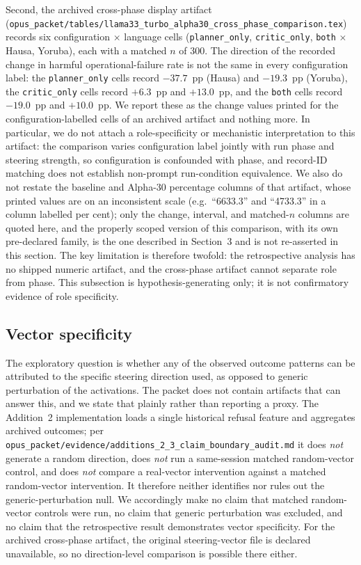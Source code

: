 Second, the archived cross-phase display artifact
(\texttt{opus\_packet/tables/llama33\_turbo\_alpha30\_cross\_phase\_comparison.tex})
records six configuration $\times$ language cells (\texttt{planner\_only},
\texttt{critic\_only}, \texttt{both} $\times$ Hausa, Yoruba), each with a matched
$n$ of 300. The direction of the recorded change in harmful
operational-failure rate is not the same in every configuration label: the
\texttt{planner\_only} cells record $-37.7$~pp (Hausa) and $-19.3$~pp (Yoruba),
the \texttt{critic\_only} cells record $+6.3$~pp and $+13.0$~pp, and the
\texttt{both} cells record $-19.0$~pp and $+10.0$~pp. We report these as the
change values printed for the configuration-labelled cells of an archived
artifact and nothing more. In particular, we do not attach a role-specificity or
mechanistic interpretation to this artifact: the comparison varies configuration
label jointly with run phase and steering strength, so configuration is
confounded with phase, and record-ID matching does not establish non-prompt
run-condition equivalence. We also do not restate the baseline and Alpha-30
percentage columns of that artifact, whose printed values are on an inconsistent
scale (e.g.\ ``6633.3'' and ``4733.3'' in a column labelled per cent); only the
change, interval, and matched-$n$ columns are quoted here, and the properly
scoped version of this comparison, with its own pre-declared family, is the one
described in Section~3 and is not re-asserted in this section. The key
limitation is therefore twofold: the retrospective analysis has no shipped
numeric artifact, and the cross-phase artifact cannot separate role from phase.
This subsection is hypothesis-generating only; it is not confirmatory evidence
of role specificity.

\subsection{Vector specificity}

The exploratory question is whether any of the observed outcome patterns can be
attributed to the specific steering direction used, as opposed to generic
perturbation of the activations. The packet does not contain artifacts that can
answer this, and we state that plainly rather than reporting a proxy. The
Addition~2 implementation loads a single historical refusal feature and
aggregates archived outcomes; per
\texttt{opus\_packet/evidence/additions\_2\_3\_claim\_boundary\_audit.md} it does
\emph{not} generate a random direction, does \emph{not} run a same-session
matched random-vector control, and does \emph{not} compare a real-vector
intervention against a matched random-vector intervention. It therefore neither
identifies nor rules out the generic-perturbation null. We accordingly make no
claim that matched random-vector controls were run, no claim that generic
perturbation was excluded, and no claim that the retrospective result
demonstrates vector specificity. For the archived cross-phase artifact, the
original steering-vector file is declared unavailable, so no direction-level
comparison is possible there either.

